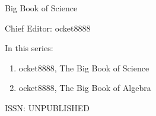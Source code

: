 {\large Big Book of Science}

\bigskip

Chief Editor: ocket8888

\bigskip

In this series:

\begin{enumerate}
\item ocket8888, The Big Book of Science
\item ocket8888, The Big Book of Algebra
\end{enumerate}


\vfill

\gdef\lsISSN{UNPUBLISHED}%
\hfill ISSN: \lsISSN

